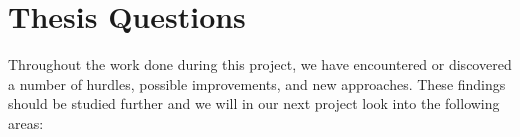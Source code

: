 \section{Thesis Questions}
Throughout the work done during this project, we have encountered or discovered a number of hurdles, possible improvements, and new approaches. These findings should be studied further and we will in our next project look into the following areas:

